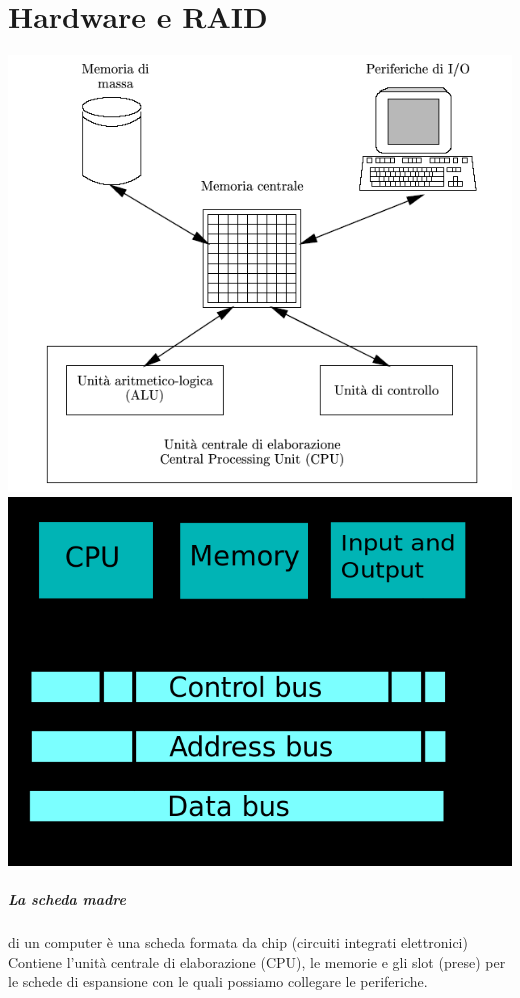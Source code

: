\documentclass[a4paper]{report}
\begin{document}
\chapter{Hardware e RAID}
\begin{center}
\includegraphics[scale=0.5]{von1.png}\\
\includegraphics[scale=0.5]{von2.png}
\end{center}
\newpage
\paragraph{La scheda madre} di un computer è una scheda
formata da chip (circuiti integrati elettronici)
Contiene l'unità centrale di elaborazione (CPU), le
memorie e gli slot (prese) per le schede di
espansione con le quali possiamo collegare le
periferiche.
\end{document}
